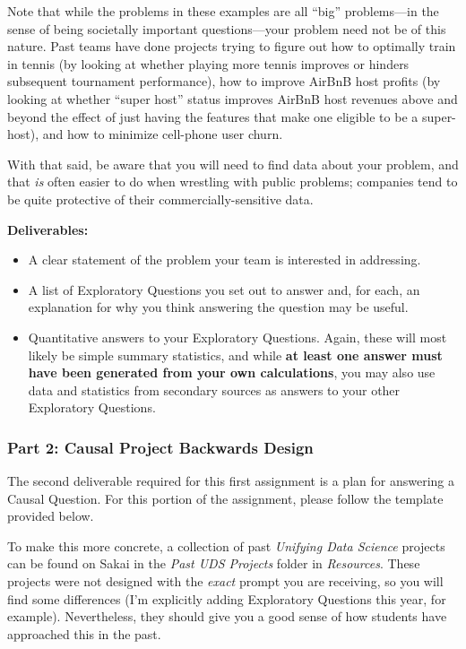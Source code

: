 \documentclass[12pt]{article}
\begin{document}
Note that while the problems in these examples are all ``big'' problems—in the sense of being societally important questions—your problem need not be of this nature. Past teams have done projects trying to figure out how to optimally train in tennis (by looking at whether playing more tennis improves or hinders subsequent tournament performance), how to improve AirBnB host profits (by looking at whether ``super host'' status improves AirBnB host revenues above and beyond the effect of just having the features that make one eligible to be a super-host), and how to minimize cell-phone user churn.

With that said, be aware that you will need to find data about your problem, and that \emph{is} often easier to do when wrestling with public problems; companies tend to be quite protective of their commercially-sensitive data. 

\textbf{Deliverables:}

\begin{itemize}
    \item A clear statement of the problem your team is interested in addressing. 
    \item A list of Exploratory Questions you set out to answer and, for each, an explanation for why you think answering the question may be useful.
    \item Quantitative answers to your Exploratory Questions. Again, these will most likely be simple summary statistics, and while \textbf{at least one answer must have been generated from your own calculations}, you may also use data and statistics from secondary sources as answers to your other Exploratory Questions.
\end{itemize}

\subsubsection*{Part 2: Causal Project Backwards Design}

The second deliverable required for this first assignment is a plan for answering a Causal Question. For this portion of the assignment, please follow the template provided below.

To make this more concrete, a collection of past \emph{Unifying Data Science} projects can be found on Sakai in the \emph{Past UDS Projects} folder in \emph{Resources}. These projects were not designed with the \emph{exact} prompt you are receiving, so you will find some differences (I'm explicitly adding Exploratory Questions this year, for example). Nevertheless, they should give you a good sense of how students have approached this in the past.
\end{document}
